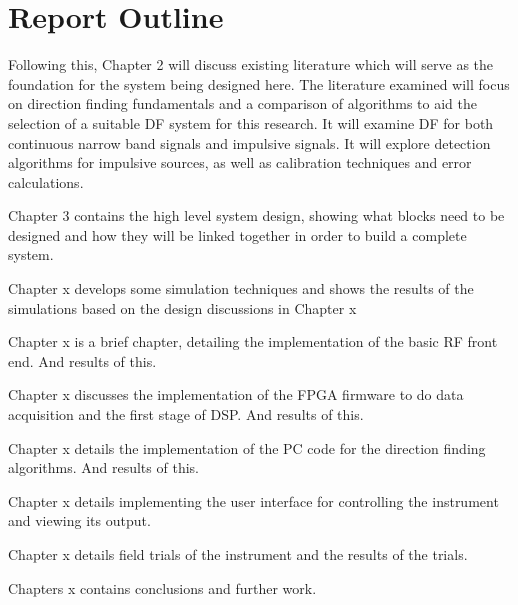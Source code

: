 \section{Report Outline}
Following this, Chapter 2 will discuss existing literature which will serve as the foundation for the system being designed here. The literature examined will focus on direction finding fundamentals and a comparison of algorithms to aid the selection of a suitable DF system for this research. It will examine DF for both continuous narrow band signals and impulsive signals. It will explore detection algorithms for impulsive sources, as well as calibration techniques and error calculations.

Chapter 3 contains the high level system design, showing what blocks need to be designed and how they will be linked together in order to build a complete system.

Chapter x develops some simulation techniques and shows the results of the simulations based on the design discussions in Chapter x

Chapter x is a brief chapter, detailing the implementation of the basic RF front end. And results of this.

Chapter x discusses the implementation of the FPGA firmware to do data acquisition and the first stage of DSP. And results of this.

Chapter x details the implementation of the PC code for the direction finding algorithms. And results of this.

Chapter x details implementing the user interface for controlling the instrument and viewing its output.

Chapter x details field trials of the instrument and the results of the trials.

Chapters x contains conclusions and further work. 

